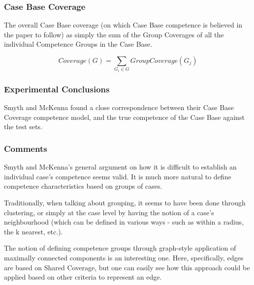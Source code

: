\documentclass[a4paper,11pt]{report}
\begin{document}
\subsubsection{Case Base Coverage}
The overall Case Base coverage (on which Case Base competence is believed in the paper to follow) as simply the sum of the Group Coverages of all the individual Competence Groups in the Case Base.

\[
Coverage(G)=\underset{G_{i}\in G}{\sum}GroupCoverage(G_{j})
\]

\subsubsection{Experimental Conclusions}
Smyth and McKenna found a close correspondence between their Case Base Coverage competence model, and the true competence of the Case Base against the test sets\citep{Smyth1998}.

\subsubsection{Comments}
Smyth and McKenna's general argument on how it is difficult to establish an individual case's competence seems valid. It is much more natural to define competence characteristics based on groups of cases. 

Traditionally, when talking about grouping, it seems to have been done through clustering, or simply at the case level by having the notion of a case's neighbourhood (which can be defined in various ways - such as within a radius, the k nearest, etc.).

The notion of defining competence groups through graph-style application of maximally connected components is an interesting one. Here, specifically, edges are based on Shared Coverage, but one can easily see how this approach could be applied based on other criteria to represent an edge.



\end{document}
